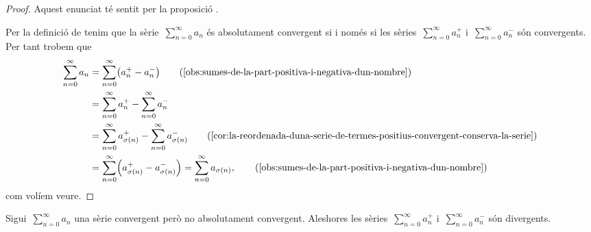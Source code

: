 \documentclass[../analisi-matematica.tex]{subfiles}
\begin{document}
    \begin{proof}
        Aquest enunciat té sentit per la proposició .

        Per la definició de  tenim que la sèrie~\(\sum_{n=0}^{\infty}a_{n}\) és absolutament convergent si i només si les sèries~\(\sum_{n=0}^{\infty}a^{+}_{n}\) i~\(\sum_{n=0}^{\infty}a^{-}_{n}\) són convergents.
        Per tant trobem que
        \begin{align*}
            \sum_{n=0}^{\infty}a_{n}&=\sum_{n=0}^{\infty}\left(a^{+}_{n}-a^{-}_{n}\right) \tag{\ref{obs:sumes-de-la-part-positiva-i-negativa-dun-nombre}}\\
            &=\sum_{n=0}^{\infty}a^{+}_{n}-\sum_{n=0}^{\infty}a^{-}_{n} \\
            &=\sum_{n=0}^{\infty}a^{+}_{\sigma(n)}-\sum_{n=0}^{\infty}a^{-}_{\sigma(n)} \tag{\ref{cor:la-reordenada-duna-serie-de-termes-positius-convergent-conserva-la-serie}}\\
            &=\sum_{n=0}^{\infty}\left(a^{+}_{\sigma(n)}-a^{-}_{\sigma(n)}\right)=\sum_{n=0}^{\infty}a_{\sigma(n)}, \tag{\ref{obs:sumes-de-la-part-positiva-i-negativa-dun-nombre}}
        \end{align*}
        com volíem veure.
    \end{proof}
    \begin{lemma}
        \label{lema:Teorema-de-la-reordenacio-de-series-de-Riemann}
        Sigui~\(\sum_{n=0}^{\infty}a_{n}\) una sèrie convergent però no absolutament convergent.
        Aleshores les sèries~\(\sum_{n=0}^{\infty}a^{+}_{n}\) i~\(\sum_{n=0}^{\infty}a^{-}_{n}\) són divergents.
    \end{lemma}
\end{document}
